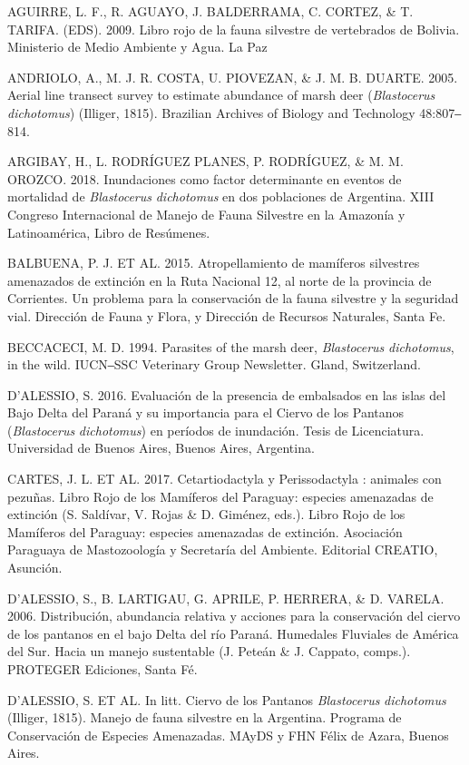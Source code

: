 \documentclass[
  x11names]{article}
\begin{document}
AGUIRRE, L. F., R. AGUAYO, J. BALDERRAMA, C. CORTEZ, \& T. TARIFA.
(EDS). 2009. Libro rojo de la fauna silvestre de vertebrados de Bolivia.
Ministerio de Medio Ambiente y Agua. La Paz

ANDRIOLO, A., M. J. R. COSTA, U. PIOVEZAN, \& J. M. B. DUARTE. 2005.
Aerial line transect survey to estimate abundance of marsh deer
(\textit{Blastocerus} \textit{dichotomus}) (Illiger, 1815). Brazilian
Archives of Biology and Technology 48:807‒814.

ARGIBAY, H., L. RODRÍGUEZ PLANES, P. RODRÍGUEZ, \& M. M. OROZCO. 2018.
Inundaciones como factor determinante en eventos de mortalidad de
\textit{Blastocerus} \textit{dichotomus} en dos poblaciones de
Argentina. XIII Congreso Internacional de Manejo de Fauna Silvestre en
la Amazonía y Latinoamérica, Libro de Resúmenes.

BALBUENA, P. J. ET AL. 2015. Atropellamiento de mamíferos silvestres
amenazados de extinción en la Ruta Nacional 12, al norte de la provincia
de Corrientes. Un problema para la conservación de la fauna silvestre y
la seguridad vial. Dirección de Fauna y Flora, y Dirección de Recursos
Naturales, Santa Fe.

BECCACECI, M. D. 1994. Parasites of the marsh deer, \textit{Blastocerus}
\textit{dichotomus}, in the wild. IUCN‒SSC Veterinary Group Newsletter.
Gland, Switzerland.

D'ALESSIO, S. 2016. Evaluación de la presencia de embalsados en las
islas del Bajo Delta del Paraná y su importancia para el Ciervo de los
Pantanos (\textit{Blastocerus} \textit{dichotomus}) en períodos de
inundación. Tesis de Licenciatura. Universidad de Buenos Aires, Buenos
Aires, Argentina.

CARTES, J. L. ET AL. 2017. Cetartiodactyla y Perissodactyla : animales
con pezuñas. Libro Rojo de los Mamíferos del Paraguay: especies
amenazadas de extinción (S. Saldívar, V. Rojas \& D. Giménez, eds.).
Libro Rojo de los Mamíferos del Paraguay: especies amenazadas de
extinción. Asociación Paraguaya de Mastozoología y Secretaría del
Ambiente. Editorial CREATIO, Asunción.

D'ALESSIO, S., B. LARTIGAU, G. APRILE, P. HERRERA, \& D. VARELA. 2006.
Distribución, abundancia relativa y acciones para la conservación del
ciervo de los pantanos en el bajo Delta del río Paraná. Humedales
Fluviales de América del Sur. Hacia un manejo sustentable (J. Peteán \&
J. Cappato, comps.). PROTEGER Ediciones, Santa Fé.

D'ALESSIO, S. ET AL. In litt. Ciervo de los Pantanos
\textit{Blastocerus} \textit{dichotomus} (Illiger, 1815). Manejo de
fauna silvestre en la Argentina. Programa de Conservación de Especies
Amenazadas. MAyDS y FHN Félix de Azara, Buenos Aires.
\end{document}
